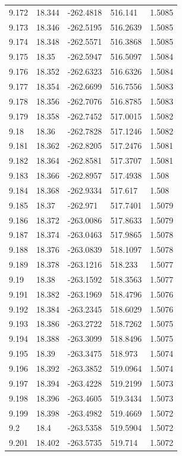 \begin{tabular}{lllll}
9.172 & 18.344 & -262.4818 & 516.141 & 1.5085 \\
9.173 & 18.346 & -262.5195 & 516.2639 & 1.5085 \\
9.174 & 18.348 & -262.5571 & 516.3868 & 1.5085 \\
9.175 & 18.35 & -262.5947 & 516.5097 & 1.5084 \\
9.176 & 18.352 & -262.6323 & 516.6326 & 1.5084 \\
9.177 & 18.354 & -262.6699 & 516.7556 & 1.5083 \\
9.178 & 18.356 & -262.7076 & 516.8785 & 1.5083 \\
9.179 & 18.358 & -262.7452 & 517.0015 & 1.5082 \\
9.18 & 18.36 & -262.7828 & 517.1246 & 1.5082 \\
9.181 & 18.362 & -262.8205 & 517.2476 & 1.5081 \\
9.182 & 18.364 & -262.8581 & 517.3707 & 1.5081 \\
9.183 & 18.366 & -262.8957 & 517.4938 & 1.508 \\
9.184 & 18.368 & -262.9334 & 517.617 & 1.508 \\
9.185 & 18.37 & -262.971 & 517.7401 & 1.5079 \\
9.186 & 18.372 & -263.0086 & 517.8633 & 1.5079 \\
9.187 & 18.374 & -263.0463 & 517.9865 & 1.5078 \\
9.188 & 18.376 & -263.0839 & 518.1097 & 1.5078 \\
9.189 & 18.378 & -263.1216 & 518.233 & 1.5077 \\
9.19 & 18.38 & -263.1592 & 518.3563 & 1.5077 \\
9.191 & 18.382 & -263.1969 & 518.4796 & 1.5076 \\
9.192 & 18.384 & -263.2345 & 518.6029 & 1.5076 \\
9.193 & 18.386 & -263.2722 & 518.7262 & 1.5075 \\
9.194 & 18.388 & -263.3099 & 518.8496 & 1.5075 \\
9.195 & 18.39 & -263.3475 & 518.973 & 1.5074 \\
9.196 & 18.392 & -263.3852 & 519.0964 & 1.5074 \\
9.197 & 18.394 & -263.4228 & 519.2199 & 1.5073 \\
9.198 & 18.396 & -263.4605 & 519.3434 & 1.5073 \\
9.199 & 18.398 & -263.4982 & 519.4669 & 1.5072 \\
9.2 & 18.4 & -263.5358 & 519.5904 & 1.5072 \\
9.201 & 18.402 & -263.5735 & 519.714 & 1.5072 \\

\end{tabular}
